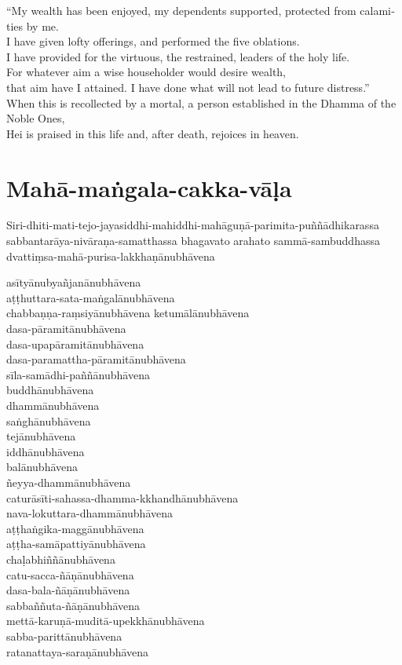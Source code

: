 \begin{english}
  ``My wealth has been enjoyed, my dependents supported, protected from calamities by me.\\
  I have given lofty offerings, and performed the five oblations.\\
  I have provided for the virtuous, the restrained, leaders of the holy life.\\
  For whatever aim a wise householder would desire wealth,\\
  that aim have I attained. I have done what will not lead to future distress.''\\
  When this is recollected by a mortal, a person established in the Dhamma of the Noble Ones,\\
  Hei is praised in this life and, after death, rejoices in heaven.
\end{english}



\section{Mahā-maṅgala-cakka-vāḷa}


Siri-dhiti-mati-tejo-jayasiddhi-mahiddhi-mahāguṇā-parimita-puññādhikarassa
sabbantarāya-nivāraṇa-samatthassa bhagavato arahato sammā-sambuddhassa
dvattiṃsa-mahā-purisa-lakkhaṇānubhāvena

asītyānubyañjanānubhāvena\\
aṭṭhuttara-sata-maṅgalānubhāvena\\
chabbaṇṇa-raṃsiyānubhāvena ketumālānubhāvena\\
dasa-pāramitānubhāvena\\
dasa-upapāramitānubhāvena\\
dasa-paramattha-pāramitānubhāvena\\
sīla-samādhi-paññānubhāvena\\
buddhānubhāvena\\
dhammānubhāvena\\
saṅghānubhāvena\\
tejānubhāvena\\
iddhānubhāvena\\
balānubhāvena\\
ñeyya-dhammānubhāvena\\
caturāsīti-sahassa-dhamma-kkhandhānubhāvena\\
nava-lokuttara-dhammānubhāvena\\
aṭṭhaṅgika-maggānubhāvena\\
aṭṭha-samāpattiyānubhāvena\\
chaḷabhiññānubhāvena\\
catu-sacca-ñāṇānubhāvena\\
dasa-bala-ñāṇānubhāvena\\
sabbaññuta-ñāṇānubhāvena\\
mettā-karuṇā-muditā-upekkhānubhāvena\\
sabba-parittānubhāvena\\
ratanattaya-saraṇānubhāvena

